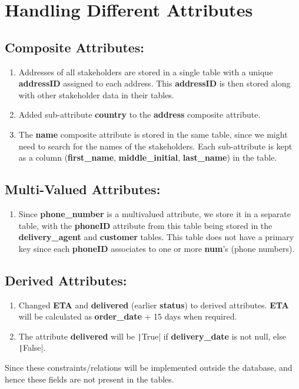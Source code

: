 \documentclass[12pt]{report}
\begin{document}
    \section*{\Huge Handling Different Attributes}
    \subsection*{Composite Attributes:}
    \begin{enumerate}
        \item
        Addresses of all stakeholders are stored in a single table with a unique \textbf{addressID} assigned to each address.
        This \textbf{addressID} is then stored along with other stakeholder data in their tables.
        \item
        Added sub-attribute \textbf{country} to the \textbf{address} composite attribute.
        \item
        The \textbf{name} composite attribute is stored in the same table, since we might need to search for the names of the stakeholders.
        Each sub-attribute is kept as a column (\textbf{first\_name}, \textbf{middle\_initial}, \textbf{last\_name}) in the table.
    \end{enumerate}

    \subsection*{Multi-Valued Attributes:}
    \begin{enumerate}
        \item
        Since \textbf{phone\_number} is a multivalued attribute, we store it in a separate table, with the \textbf{phoneID} attribute from this table being stored in the \textbf{delivery\_agent} and \textbf{customer} tables.
        This table does not have a primary key since each \textbf{phoneID} associates to one or more \textbf{num}'s (phone numbers).
    \end{enumerate}

    \subsection*{Derived Attributes:}
    \begin{enumerate}
        \item
        Changed \textbf{ETA} and \textbf{delivered} (earlier \textbf{status}) to derived attributes.
        \textbf{ETA} will be calculated as \textbf{order\_date} + 15 days when required.
        \item
        The attribute \textbf{delivered} will be \texttt|True| if \textbf{delivery\_date} is not null, else \texttt|False|.
    \end{enumerate}
    Since these constraints/relations will be implemented outside the database, and hence these fields are not present in the tables.
\end{document}
